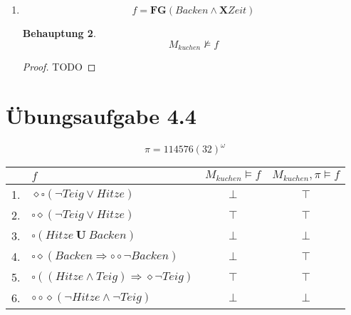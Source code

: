 \documentclass[a4paper]{scrartcl}
\newtheorem*{behaupt}{Behauptung}
\begin{document}
\begin{enumerate}
        \begin{align}
            Sat(Teig \lor \lnot Hitze) &= \left\{ 1, 4, 5 \right\} \\
            Sat(\lnot Teig) &= \left\{ 1, 2, 3, 6, 7 \right\}
        \end{align}

        \begin{behaupt}
            \begin{equation}
                M_{kuchen} \models f
            \end{equation}
        \end{behaupt}

        \begin{proof}
            TODO
        \end{proof}

    \item
        \begin{equation}
            f = \textbf{FG}(Backen \land \textbf{X}Zeit)
        \end{equation}

        \begin{behaupt}
            \begin{equation}
                M_{kuchen} \not\models f
            \end{equation}
        \end{behaupt}

        \begin{proof}
            TODO
        \end{proof}

\end{enumerate}

\section*{Übungsaufgabe 4.4}
\begin{equation*}
    \pi = 114576(32)^\omega
\end{equation*}

\begin{table}[h]
    \centering
    \begin{tabular}{r|l|c|c}
           & $f$ & $M_{kuchen} \models  f$ & $M_{kuchen}, \pi \models  f$ \\ \hline
        1. & $\diamond\square(\lnot Teig \lor Hitze)$                     & $\bot$ & $\top$ \\
        2. & $\square\diamond(\lnot Teig \lor Hitze)$                     & $\top$ & $\top$ \\
        3. & $\square(Hitze ~\textbf{U}~ Backen)$                         & $\bot$ & $\bot$ \\
        4. & $\square\diamond(Backen \Rightarrow \circ\circ\lnot Backen)$ & $\bot$ & $\top$ \\
        5. & $\square((Hitze \land Teig) \Rightarrow \diamond\lnot Teig)$ & $\top$ & $\top$ \\
        6. & $\circ\circ\diamond(\lnot Hitze \land \lnot Teig)$           & $\bot$ & $\bot$ \\
    \end{tabular}
\end{table}
\end{document}
